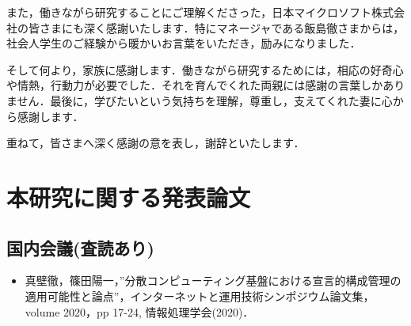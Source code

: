 \documentclass[12pt,a4j]{ujreport}
\begin{document}
また，働きながら研究することにご理解くださった，日本マイクロソフト株式会社の皆さまにも深く感謝いたします．特にマネージャである飯島徹さまからは，社会人学生のご経験から暖かいお言葉をいただき，励みになりました．

そして何より，家族に感謝します．働きながら研究するためには，相応の好奇心や情熱，行動力が必要でした．それを育んでくれた両親には感謝の言葉しかありません．最後に，学びたいという気持ちを理解，尊重し，支えてくれた妻に心から感謝します．

重ねて，皆さまへ深く感謝の意を表し，謝辞といたします．

\chapter*{本研究に関する発表論文}
\section*{国内会議(査読あり)}
\begin{itemize}
    \item 真壁徹，篠田陽一，”分散コンピューティング基盤における宣言的構成管理の適用可能性と論点”，インターネットと運用技術シンポジウム論文集，volume 2020，pp 17-24, 情報処理学会(2020)．
\end{itemize}
\end{document}
